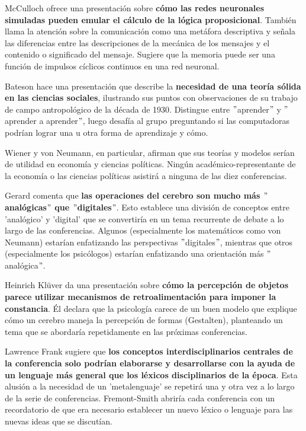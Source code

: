 \documentclass[11pt]{article}
\begin{document}
		McCulloch ofrece una presentación sobre \textbf{cómo las redes neuronales simuladas pueden emular el cálculo de la lógica proposicional}. También llama la atención sobre la comunicación como una metáfora descriptiva y señala las diferencias entre las descripciones de la mecánica de los mensajes y el contenido o significado del mensaje. Sugiere que la memoria puede ser una función de impulsos cíclicos continuos en una red neuronal.\par
		Bateson hace una presentación que describe la \textbf{necesidad de una teoría sólida en las ciencias sociales}, ilustrando sus puntos con observaciones de su trabajo de campo antropológico de la década de 1930. Distingue entre $"$aprender$"$ y $"$aprender a aprender$"$, luego desafía al grupo preguntando si las computadoras podrían lograr una u otra forma de aprendizaje y cómo.\par
		Wiener y von Neumann, en particular, afirman que sus teorías y modelos serían de utilidad en economía y ciencias políticas. Ningún académico-representante de la economía o las ciencias políticas asistirá a ninguna de las diez conferencias.\par
		Gerard comenta que \textbf{las operaciones del cerebro son mucho más $"$analógicas$"$ que $"$digitales$"$}. Esto establece una división de conceptos entre 'analógico' y 'digital' que se convertiría en un tema recurrente de debate a lo largo de las conferencias. Algunos (especialmente los matemáticos como von Neumann) estarían enfatizando las perspectivas $"$digitales$"$, mientras que otros (especialmente los psicólogos) estarían enfatizando una orientación más $"$analógica$"$.\par						Heinrich Klüver da una presentación sobre \textbf{cómo la percepción de objetos parece utilizar mecanismos de retroalimentación para imponer la constancia}. Él declara que la psicología carece de un buen modelo que explique cómo un cerebro maneja la percepción de formas (Gestalten), planteando un tema que se abordaría repetidamente en las próximas conferencias.\par
		Lawrence Frank sugiere que \textbf{los conceptos interdisciplinarios centrales de la conferencia solo podrían elaborarse y desarrollarse con la ayuda de un lenguaje más general que los léxicos disciplinarios de la época}. Esta alusión a la necesidad de un 'metalenguaje' se repetirá una y otra vez a lo largo de la serie de conferencias. Fremont-Smith abriría cada conferencia con un recordatorio de que era necesario establecer un nuevo léxico o lenguaje para las nuevas ideas que se discutían.\par
\end{document}
